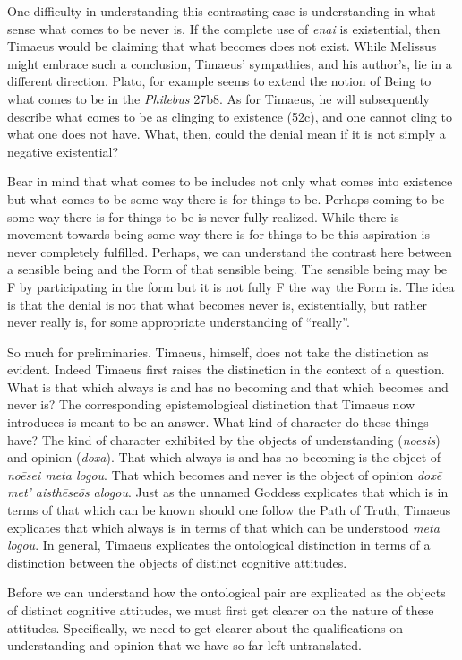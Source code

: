 One difficulty in understanding this contrasting case is understanding in what sense what comes to be never is. If the complete use of \emph{enai} is existential, then Timaeus would be claiming that what becomes does not exist. While Melissus might embrace such a conclusion, Timaeus' sympathies, and his author's, lie in a different direction. Plato, for example seems to extend the notion of Being to what comes to be in the \emph{Philebus} 27b8. As for Timaeus, he will subsequently describe what comes to be as clinging to existence (52c), and one cannot cling to what one does not have. What, then, could the denial mean if it is not simply a negative existential?

Bear in mind that what comes to be includes not only what comes into existence but what comes to be some way there is for things to be. Perhaps coming to be some way there is for things to be is never fully realized. While there is movement towards being some way there is for things to be this aspiration is never completely fulfilled. Perhaps, we can understand the contrast here between a sensible being and the Form of that sensible being. The sensible being may be F by participating in the form but it is not fully F the way the Form is. The idea is that the denial is not that what becomes never is, existentially, but rather never really is, for some appropriate understanding of ``really''.

So much for preliminaries. Timaeus, himself, does not take the distinction as evident. Indeed Timaeus first raises the distinction in the context of a question. What is that which always is and has no becoming and that which becomes and never is? The corresponding epistemological distinction that Timaeus now introduces is meant to be an answer.  What kind of character do these things have? The kind of character exhibited by the objects of understanding (\emph{noesis}) and opinion (\emph{doxa}). That which always is and has no becoming is the object of \emph{noēsei meta logou}. That which becomes and never is the object of opinion \emph{doxē met' aisthēseōs alogou}. Just as the unnamed Goddess explicates that which is in terms of that which can be known should one follow the Path of Truth, Timaeus explicates that which always is in terms of that which can be understood \emph{meta logou}. In general, Timaeus explicates the ontological distinction in terms of a distinction between the objects of distinct cognitive attitudes.

Before we can understand how the ontological pair are explicated as the objects of distinct cognitive attitudes, we must first get clearer on the nature of these attitudes. Specifically, we need to get clearer about the qualifications on understanding and opinion that we have so far left untranslated. 

